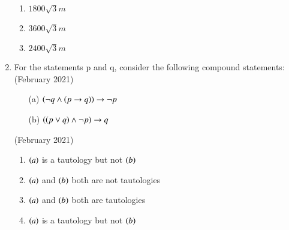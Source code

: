 \documentclass[journal,12pt,onecolumn]{IEEEtran}
\theoremstyle{remark}
\begin{document}
\begin{enumerate}
\begin{enumerate}
    \item $1800\sqrt{3}m$
    \item $3600\sqrt{3}m$
    \item $2400\sqrt{3}m$
\end{enumerate}
\item For the statements p and q, consider the following compound statements:
\hfill{(February 2021)} 
\begin{enumerate}
    \item[(a)] $\left(\neg q \land \left(p \rightarrow q\right)\right) \rightarrow \neg p $
    \item[(b)] $\left(\left(p \lor q\right) \land \neg p\right)\rightarrow q$
\end{enumerate}
\hfill{(February 2021)} 
\begin{enumerate}
    \item $\left(a\right)$ is a tautology but not $\left(b\right)$
    \item $\left(a\right)$ and $\left(b\right)$ both are not tautologies
    \item $\left(a\right)$ and $\left(b\right)$ both are tautologies
    \item $\left(a\right)$ is a tautology but not $\left(b\right)$
\end{enumerate}
    \end{enumerate}
\end{document}
